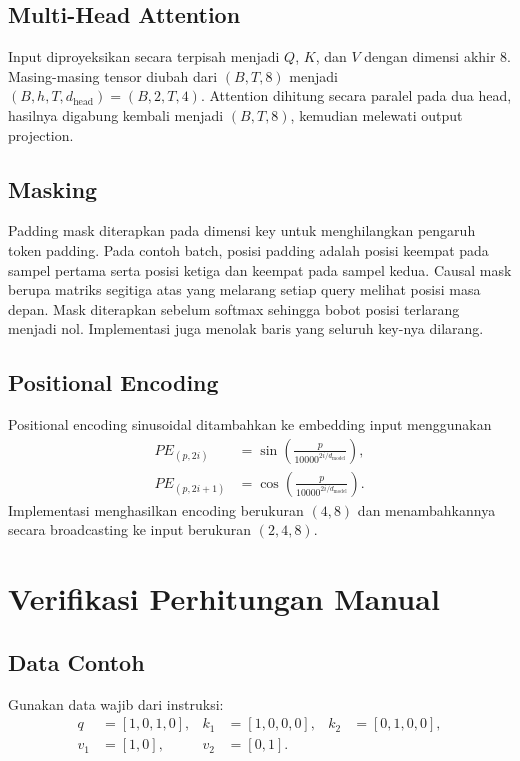 \documentclass[12pt,a4paper]{article}
\begin{document}
\subsection{Multi-Head Attention}
Input diproyeksikan secara terpisah menjadi $Q$, $K$, dan $V$ dengan dimensi
akhir 8. Masing-masing tensor diubah dari $(B,T,8)$ menjadi
$(B,h,T,d_{\text{head}})=(B,2,T,4)$. Attention dihitung secara paralel pada
dua head, hasilnya digabung kembali menjadi $(B,T,8)$, kemudian melewati
output projection.

\subsection{Masking}
Padding mask diterapkan pada dimensi key untuk menghilangkan pengaruh token
padding. Pada contoh batch, posisi padding adalah posisi keempat pada sampel
pertama serta posisi ketiga dan keempat pada sampel kedua. Causal mask berupa
matriks segitiga atas yang melarang setiap query melihat posisi masa depan.
Mask diterapkan sebelum softmax sehingga bobot posisi terlarang menjadi nol.
Implementasi juga menolak baris yang seluruh key-nya dilarang.

\subsection{Positional Encoding}
Positional encoding sinusoidal ditambahkan ke embedding input menggunakan
\begin{align}
 PE_{(p,2i)} &= \sin\left(\frac{p}{10000^{2i/d_{\text{model}}}}\right),\\
 PE_{(p,2i+1)} &= \cos\left(\frac{p}{10000^{2i/d_{\text{model}}}}\right).
\end{align}
Implementasi menghasilkan encoding berukuran $(4,8)$ dan menambahkannya
secara broadcasting ke input berukuran $(2,4,8)$.

\section{Verifikasi Perhitungan Manual}

\subsection{Data Contoh}
Gunakan data wajib dari instruksi:
\begin{align*}
q  &= [1,0,1,0], &
k_1 &= [1,0,0,0], &
k_2 &= [0,1,0,0],\\
v_1 &= [1,0], &
v_2 &= [0,1]. &&
\end{align*}
\end{document}
